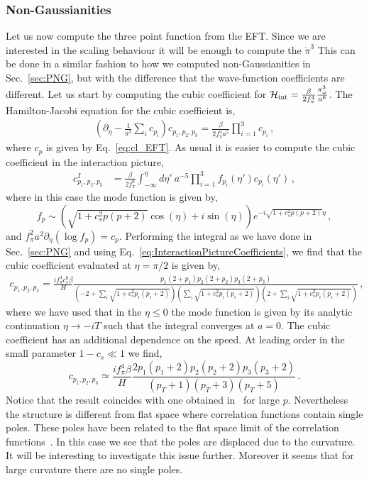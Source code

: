 \documentclass[a4paper,11pt]{article}
\numberwithin{equation}{section}
\numberwithin{equation}{section}
\begin{document}
\subsubsection*{Non-Gaussianities}
Let us now compute the three point function from the EFT. Since we are interested in the scaling behaviour it will be enough  to compute the $\dot\pi^3$ This can be done in a similar fashion to how we computed non-Gaussianities in Sec.~\ref{sec:PNG}, but with the difference that the wave-function coefficients are different. Let us start by computing the  cubic coefficient for $\mathcal{H}_{\rm{int}}=\frac{\beta}{2f_\pi^4}\frac{\pi_\varphi^3}{a^6}$. 
The Hamilton-Jacobi equation for the cubic coefficient is,
\begin{align}
\left(\partial_\eta -\frac{1}{a^2}\sum_i c_{p_i}\right)c_{p_1,p_2,p_3}=\frac{\beta }{2 f_\pi^4a^5}\prod_{i=1}^3 c_{p_i} \,,
\end{align}
 where $c_p$ is given by Eq.~\eqref{eq:cl_EFT}. As usual it is easier to  compute the cubic coefficient in the interaction picture,
\begin{align}
c^I_{p_1,p_2,p_3}&= \frac{\beta }{2 f_\pi^8} \int_{-\infty}^{\eta} d\eta'\  a^{-5}\prod_{i=1}^3 f_{p_i}(\eta')c_{p_i}(\eta') \,,
\end{align}
where in this case the mode function is given by,
\begin{equation}
f_p\sim(\sqrt{1+c_s^2 p(p+2)}\cos(\eta)+i\sin(\eta))e^{-i\sqrt{1+c_s^2 p(p+2)}\eta} \,,
\end{equation}
and $f_\pi^2a^2\partial_\eta(\log f_p)=c_p$.
Performing the integral as we have done in Sec.~\ref{sec:PNG} and using Eq.~\eqref{eq:InteractionPictureCoefficients}, we find that the cubic coefficient evaluated at $\eta = \pi/2$ is given by,
\begin{align}
c_{p_1,p_2,p_3}=\frac{if_\pi^4  c_s^6 \beta}{H}\frac{p_1(2+p_1)p_2(2+p_2)p_3(2+p_3)}{(-2+\sum_i\sqrt{1+c_s^2 p_i(p_i+2)})(\sum_i\sqrt{1+c_s^2 p_i(p_i+2)})(2+\sum_i\sqrt{1+c_s^2 p_i(p_i+2)})} \,,
\end{align}
where we have used that in the $\eta\leq 0$ the mode function is given by its analytic continuation $\eta\to-iT$ such that the integral converges  at $a=0$. The cubic coefficient has an additional dependence on the speed. At leading order in the small parameter $1-c_s \ll 1$ we find,
\begin{equation}
c_{p_1,p_2,p_3} \simeq \frac{i f_\pi^4 \beta}{H}\frac{2 p_1 (p_1+2) p_2 (p_2+2) p_3
   (p_3+2)}{(p_T+1) (p_T+3)
   (p_T+5)} \,.
\end{equation}
Notice that the result coincides with one obtained in~\cite{Cespedes:2020xpn} for large $p$. Nevertheless the structure is different from flat space where correlation functions contain single poles. These poles have been related to the flat space limit of the correlation functions~\cite{Maldacena:2011nz,Raju:2012zr}. In this case we see that the poles are displaced due to the curvature. It will be interesting to investigate this issue further. Moreover it seems that for large curvature there are no single poles.
\end{document}
